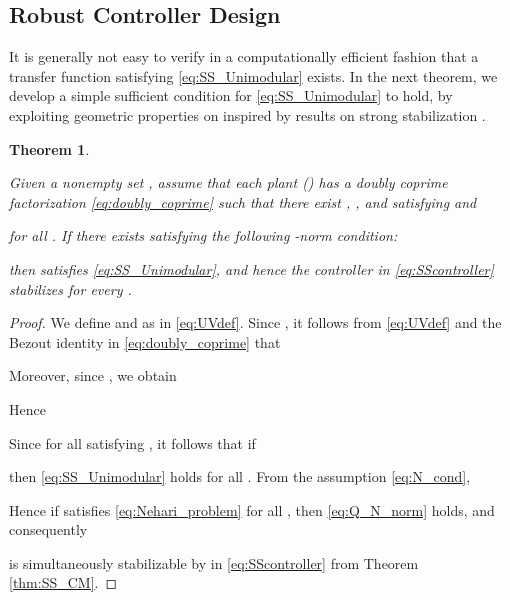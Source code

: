 \documentclass[letterpaper, 12pt, draftcls, onecolumn]{ieeeconf}
\newtheorem{theorem}{Theorem}[section]
\begin{document}
\subsection{Robust Controller Design}
It is generally not easy to verify 
in a computationally efficient fashion
that
a transfer function  satisfying 
\eqref{eq:SS_Unimodular} exists.
In the next theorem, we develop a simple sufficient condition for
\eqref{eq:SS_Unimodular} to hold, by exploiting geometric properties
on  inspired by results
on strong stabilization \cite{zeren2000}.
\begin{theorem}
	\label{thm:suff}
	{\it
		Given a nonempty set , 
		assume that each plant  ()
		has a doubly coprime factorization \eqref{eq:doubly_coprime} 
		such that 
		there exist , 
		,
		and  satisfying 
		 and
		
		for all .
If there exists  
		satisfying
		the following -norm condition:
		
		then  satisfies \eqref{eq:SS_Unimodular}, and hence
		the controller  in \eqref{eq:SScontroller} stabilizes 
		 for every .
	}
\end{theorem}
\begin{proof}
	We define  and  as in
	\eqref{eq:UVdef}. Since , 
	it follows from \eqref{eq:UVdef} and
	the Bezout identity  
	in \eqref{eq:doubly_coprime} that
	
	Moreover, since , we obtain
	
	Hence 
	
	Since  for all
	 satisfying ,
	it follows that
	if
	
	then \eqref{eq:SS_Unimodular} holds for all . 
	From the assumption \eqref{eq:N_cond}, 
	
	Hence if  satisfies \eqref{eq:Nehari_problem} 
	for all ,
	then 
	\eqref{eq:Q_N_norm} holds, and consequently
	
	is simultaneously stabilizable by  in \eqref{eq:SScontroller}
	from Theorem \ref{thm:SS_CM}.
	\hspace*{\fill}  
\end{proof}
\end{document}
